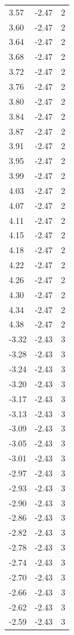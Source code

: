 \begin{longtable}{lrr}
  3.57 & -2.47 & 2 \\
  3.60 & -2.47 & 2 \\
  3.64 & -2.47 & 2 \\
  3.68 & -2.47 & 2 \\
  3.72 & -2.47 & 2 \\
  3.76 & -2.47 & 2 \\
  3.80 & -2.47 & 2 \\
  3.84 & -2.47 & 2 \\
  3.87 & -2.47 & 2 \\
  3.91 & -2.47 & 2 \\
  3.95 & -2.47 & 2 \\
  3.99 & -2.47 & 2 \\
  4.03 & -2.47 & 2 \\
  4.07 & -2.47 & 2 \\
  4.11 & -2.47 & 2 \\
  4.15 & -2.47 & 2 \\
  4.18 & -2.47 & 2 \\
  4.22 & -2.47 & 2 \\
  4.26 & -2.47 & 2 \\
  4.30 & -2.47 & 2 \\
  4.34 & -2.47 & 2 \\
  4.38 & -2.47 & 2 \\
  -3.32 & -2.43 & 3 \\
  -3.28 & -2.43 & 3 \\
  -3.24 & -2.43 & 3 \\
  -3.20 & -2.43 & 3 \\
  -3.17 & -2.43 & 3 \\
  -3.13 & -2.43 & 3 \\
  -3.09 & -2.43 & 3 \\
  -3.05 & -2.43 & 3 \\
  -3.01 & -2.43 & 3 \\
  -2.97 & -2.43 & 3 \\
  -2.93 & -2.43 & 3 \\
  -2.90 & -2.43 & 3 \\
  -2.86 & -2.43 & 3 \\
  -2.82 & -2.43 & 3 \\
  -2.78 & -2.43 & 3 \\
  -2.74 & -2.43 & 3 \\
  -2.70 & -2.43 & 3 \\
  -2.66 & -2.43 & 3 \\
  -2.62 & -2.43 & 3 \\
  -2.59 & -2.43 & 3 \\

\end{longtable}
